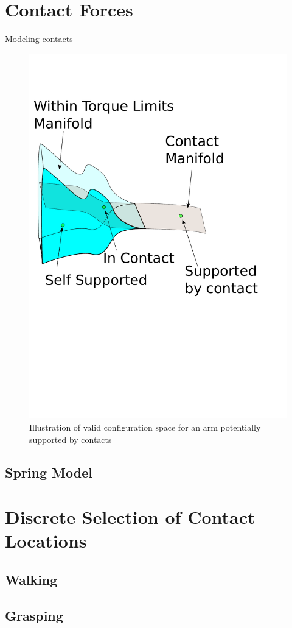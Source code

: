 \documentclass[../thesis.tex]{subfiles}
\begin{document}
\section{Contact Forces}
Modeling contacts
\begin{figure}
  \centering
  \includegraphics[width=.5\linewidth]{./Planning/thin_manifold.pdf}
  
  \caption{Illustration of valid configuration space for an arm potentially supported by contacts}
  \label{fig:ThinManifold}
\end{figure}


\subsection{Spring Model}
\subsection{}


\section{Discrete Selection of Contact Locations}
\subsection{Walking}
\subsection{Grasping}
\end{document}
